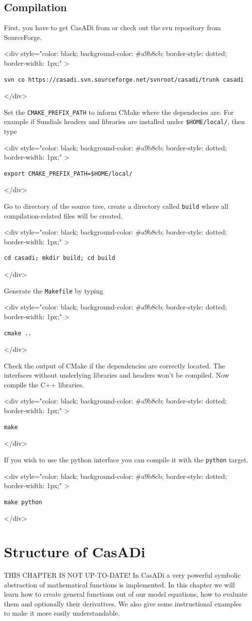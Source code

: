 \documentclass[a4paper,12pt]{book}
\newcommand{\codebegin}{
\begin{rawhtml}
<div style="color: black; background-color: \#a9b8cb;  border-style: dotted; border-width: 1px;" >
\end{rawhtml}
}
\newcommand{\codeend}{
\begin{rawhtml}
</div>
\end{rawhtml}
}
\newcommand{\codebegin}{

}
\newcommand{\codeend}{

}
\begin{document}
\section{Compilation}
First, you have to get CasADi from  or check out the svn repository from SourceForge.
\par
\codebegin
\begin{verbatim}
svn co https://casadi.svn.sourceforge.net/svnroot/casadi/trunk casadi
\end{verbatim}
\codeend
Set the \texttt{CMAKE\_PREFIX\_PATH} to inform CMake where the dependecies are. 
For example if Sundials headers and libraries are installed under \texttt{\$HOME/local/}, then type
\par
\codebegin{
\begin{verbatim}
export CMAKE_PREFIX_PATH=$HOME/local/
\end{verbatim}
\codeend
\par
Go to directory of the source tree, create a directory called \texttt{build} where all compilation-related files will be created.
\par
\codebegin
\begin{verbatim}
cd casadi; mkdir build; cd build
\end{verbatim}
\codeend
Generate the \texttt{Makefile} by typing
\par
\codebegin
\begin{verbatim}
cmake ..
\end{verbatim}
\codeend
Check the output of CMake if the dependencies are correctly located. The interfaces without underlying libraries and headers won't be compiled.
Now compile the C++ libraries.
\par
\codebegin
\begin{verbatim}
make
\end{verbatim}
\codeend
If you wish to use the python interface you can compile it with the \texttt{python} target.
\par
\codebegin
\begin{verbatim}
make python
\end{verbatim}
\codeend

\chapter{Structure of CasADi}
{\color{red}THIS CHAPTER IS NOT UP-TO-DATE!}
In CasADi a very powerful symbolic abstraction of mathematical functions is implemented.
In this chapter we will learn how to create general functions out of our model equations, 
how to evaluate them and optionally their derivatives. We also give some instructional
examples to make it more easily understandable.

}
\end{document}
